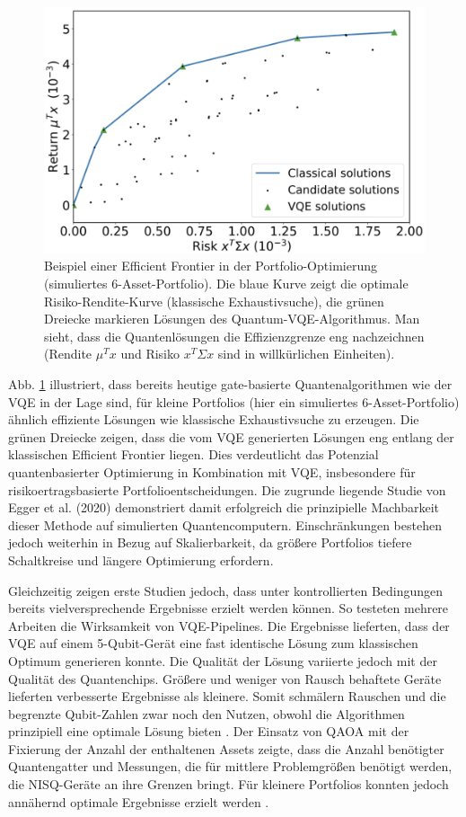 \begin{figure}
    \centering
    \includegraphics[width=0.8\linewidth]{EfficientFrontier_VQE.png}
    \caption{Beispiel einer Efficient Frontier in der Portfolio-Optimierung (simuliertes 6-Asset-Portfolio). Die blaue Kurve zeigt die optimale Risiko-Rendite-Kurve (klassische Exhaustivsuche), die grünen Dreiecke markieren Lösungen des Quantum-VQE-Algorithmus. Man sieht, dass die Quantenlösungen die Effizienzgrenze eng nachzeichnen (Rendite $\mu^T x$ und Risiko $x^T \Sigma x$ sind in willkürlichen Einheiten). \cite[Abb. 8]{egger_quantum_2020}}
    \label{fig:efficient_frontier_vqe}
\end{figure}


Abb. \ref{fig:efficient_frontier_vqe} illustriert, dass bereits heutige gate-basierte Quantenalgorithmen wie der VQE in der Lage sind, für kleine Portfolios (hier ein simuliertes 6-Asset-Portfolio) ähnlich effiziente Lösungen wie klassische Exhaustivsuche zu erzeugen. Die grünen Dreiecke zeigen, dass die vom VQE generierten Lösungen eng entlang der klassischen Efficient Frontier liegen. Dies verdeutlicht das Potenzial quantenbasierter Optimierung in Kombination mit VQE, insbesondere für risikoertragsbasierte Portfolioentscheidungen. Die zugrunde liegende Studie von Egger et al. (2020) demonstriert damit erfolgreich die prinzipielle Machbarkeit dieser Methode auf simulierten Quantencomputern. Einschränkungen bestehen jedoch weiterhin in Bezug auf Skalierbarkeit, da größere Portfolios tiefere Schaltkreise und längere Optimierung erfordern.
 
Gleichzeitig zeigen erste Studien jedoch, dass unter kontrollierten Bedingungen bereits vielversprechende Ergebnisse erzielt werden können. So testeten mehrere Arbeiten die Wirksamkeit von VQE-Pipelines. Die Ergebnisse lieferten, dass der VQE auf einem 5-Qubit-Gerät eine fast identische Lösung zum klassischen Optimum generieren konnte. Die Qualität der Lösung variierte jedoch mit der Qualität des Quantenchips. Größere und weniger von Rausch behaftete Geräte lieferten verbesserte Ergebnisse als kleinere. Somit schmälern Rauschen und die begrenzte Qubit-Zahlen zwar noch den Nutzen, obwohl die Algorithmen prinzipiell eine optimale Lösung bieten \cite{buonaiuto_best_2023}.
Der Einsatz von QAOA mit der Fixierung der Anzahl der enthaltenen Assets zeigte, dass die Anzahl benötigter Quantengatter und Messungen, die für mittlere Problemgrößen benötigt werden, die NISQ-Geräte an ihre Grenzen bringt. Für kleinere Portfolios konnten jedoch annähernd optimale Ergebnisse erzielt werden \cite{brandhofer_benchmarking_2022}.
 
